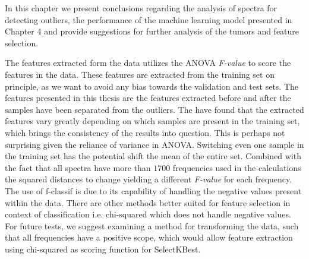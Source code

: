 
In this chapter we present conclusions regarding the analysis of spectra for detecting outliers, the performance of the machine learning model presented in Chapter 4 and provide suggestions for further analysis of the tumors and feature selection.

The features extracted form the data utilizes the ANOVA \textit{F-value} to score the features in the data. These features are extracted from the training set on principle, as we want to avoid any bias towards the validation and test sets. The features presented in this thesis are the features extracted before and after the samples have been separated from the outliers. The have found that the extracted features vary greatly depending on which samples are present in the training set, which brings the consistency of the results into question. This is perhaps not surprising given the reliance of variance in ANOVA. Switching even one sample in the training set has the potential shift the mean of the entire set. Combined with the fact that all spectra have more than $1700$ frequencies used in the calculations the squared distances to change yielding a different \textit{F-value} for each frequency. The use of f-classif is due to its capability of handling the negative values present within the data. There are other methods better suited for feature selection in context of classification i.e. chi-squared which does not handle negative values. For future tests, we suggest examining a method for transforming the data, such that all frequencies have a positive scope, which would allow feature extraction using chi-squared as scoring function for SelectKBest.

